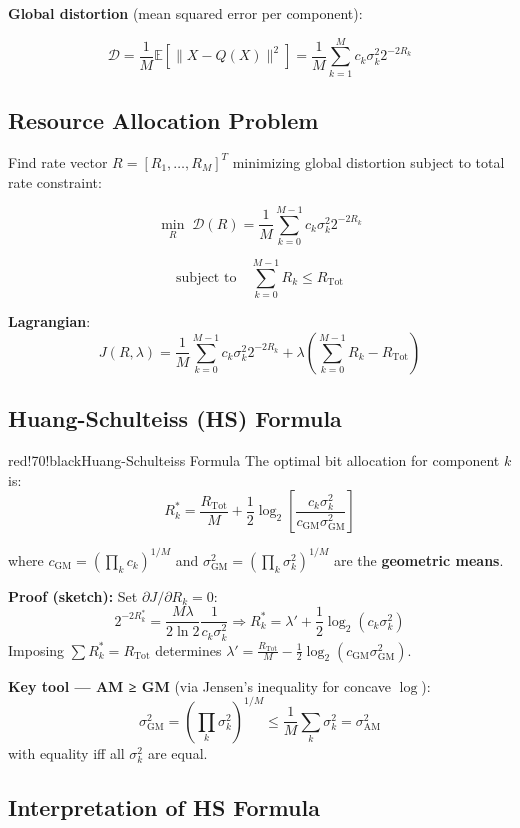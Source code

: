 \textbf{Global distortion} (mean squared error per component):

\[
\mathcal{D} = \frac{1}{M} \mathbb{E}\left[\|X - Q(X)\|^2\right] = \frac{1}{M}\sum_{k=1}^{M} c_k \sigma_k^2 2^{-2R_k}
\]

\subsection{Resource Allocation Problem}

Find rate vector $R = [R_1, \ldots, R_M]^T$ minimizing global distortion subject to total rate constraint:

\[
\min_R \; \mathcal{D}(R) = \frac{1}{M}\sum_{k=0}^{M-1} c_k \sigma_k^2 2^{-2R_k}
\]

\[
\text{subject to} \quad \sum_{k=0}^{M-1} R_k \leq R_{\text{Tot}}
\]

\textbf{Lagrangian}:
\[
J(R, \lambda) = \frac{1}{M}\sum_{k=0}^{M-1} c_k \sigma_k^2 2^{-2R_k} + \lambda\left(\sum_{k=0}^{M-1} R_k - R_{\text{Tot}}\right)
\]

\subsection{Huang-Schulteiss (HS) Formula}

\begin{calloutbox}{red!70!black}{Huang-Schulteiss Formula}
The optimal bit allocation for component $k$ is:
\[
R_k^* = \frac{R_{\text{Tot}}}{M} + \frac{1}{2}\log_2\left[\frac{c_k \sigma_k^2}{c_{\text{GM}} \sigma_{\text{GM}}^2}\right]
\]

where $c_{\text{GM}} = \left(\prod_k c_k\right)^{1/M}$ and $\sigma_{\text{GM}}^2 = \left(\prod_k \sigma_k^2\right)^{1/M}$ are the \textbf{geometric means}.

\textbf{Proof (sketch):} Set $\partial J/\partial R_k = 0$:
\[
2^{-2R_k^*} = \frac{M\lambda}{2\ln 2}\frac{1}{c_k \sigma_k^2} \Rightarrow R_k^* = \lambda' + \frac{1}{2}\log_2(c_k\sigma_k^2)
\]
Imposing $\sum R_k^* = R_{\text{Tot}}$ determines $\lambda' = \frac{R_{\text{Tot}}}{M} - \frac{1}{2}\log_2(c_{\text{GM}}\sigma_{\text{GM}}^2)$.
\end{calloutbox}

\textbf{Key tool — AM ≥ GM} (via Jensen's inequality for concave $\log$):
\[
\sigma_{\text{GM}}^2 = \left(\prod_k \sigma_k^2\right)^{1/M} \leq \frac{1}{M}\sum_k \sigma_k^2 = \sigma_{\text{AM}}^2
\]
with equality iff all $\sigma_k^2$ are equal.

\subsection{Interpretation of HS Formula}

